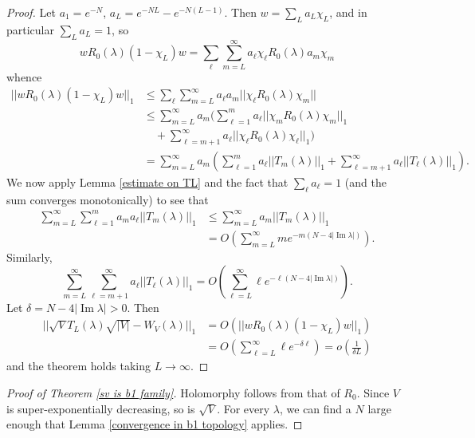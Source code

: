 \documentclass[12pt]{report}
\renewcommand{\Im}{\operatorname{Im}}
\theoremstyle{definition}
\begin{document}
\begin{proof}
Let $a_1 = e^{-N}$, $a_L = e^{-NL} - e^{-N(L-1)}$. Then $w = \sum_L a_L \chi_L$, and in particular $\sum_L a_L = 1$, so
$$wR_0(\lambda)(1 - \chi_L)w = \sum_\ell \sum_{m=L}^\infty a_\ell\chi_\ell R_0(\lambda) a_m \chi_m$$
whence
\begin{align*}
  ||wR_0(\lambda)(1 - \chi_L)w||_1 &\leq \sum_\ell \sum_{m=L}^\infty a_\ell a_m ||\chi_\ell R_0(\lambda) \chi_m||\\
  &\leq \sum_{m=L}^\infty a_m \bigg(\sum_{\ell=1}^m a_\ell ||\chi_m R_0(\lambda) \chi_m||_1\\
    &\quad+ \sum_{\ell=m+1}^\infty a_\ell ||\chi_\ell R_0(\lambda) \chi_\ell||_1 \bigg)\\
  &= \sum_{m=L}^\infty a_m \left(\sum_{\ell=1}^m a_\ell ||T_m(\lambda)||_1 + \sum_{\ell=m+1}^\infty a_\ell ||T_\ell(\lambda)||_1 \right).
\end{align*}
We now apply Lemma \ref{estimate on TL} and the fact that $\sum_\ell a_\ell = 1$ (and the sum converges monotonically) to see that
\begin{align*}
  \sum_{m=L}^\infty\sum_{\ell=1}^m a_m a_\ell ||T_m(\lambda)||_1 &\leq \sum_{m=L}^\infty a_m ||T_m(\lambda)||_1\\
  &= O\left(\sum_{m=L}^\infty me^{-m(N-4|\Im \lambda|)}\right).
\end{align*}
Similarly,
$$\sum_{m=L}^\infty \sum_{\ell=m+1}^\infty a_\ell ||T_\ell(\lambda)||_1 = O\left(\sum_{\ell=L}^\infty \ell e^{-\ell(N-4|\Im \lambda|)}\right).$$
Let $\delta = N - 4|\Im \lambda| > 0$. Then
\begin{align*}
  ||\sqrt V T_L(\lambda) \sqrt{|V|} - W_V(\lambda)||_1 &= O(||wR_0(\lambda)(1 - \chi_L)w||_1) \\
  &= O\left(\sum_{\ell=L}^\infty \ell e^{-\delta \ell} \right) = o\left(\frac{1}{\delta L}\right)
\end{align*}
and the theorem holds taking $L \to \infty$.
\end{proof}

\begin{proof}[Proof of Theorem \ref{sv is b1 family}]
Holomorphy follows from that of $R_0$. Since $V$ is super-exponentially decreasing, so is $\sqrt V$. For every $\lambda$, we can find a $N$ large enough that Lemma \ref{convergence in b1 topology} applies.
\end{proof}
\end{document}
